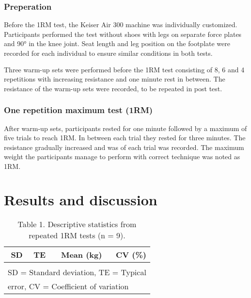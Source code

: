 \documentclass[
]{book}
\begin{document}
\hypertarget{preperation}{%
\subsubsection{Preperation}\label{preperation}}

Before the 1RM test, the Keiser Air 300 machine was individually customized. Participants performed the test without shoes with legs on separate force plates and 90° in the knee joint. Seat length and leg position on the footplate were recorded for each individual to ensure similar conditions in both tests.

Three warm-up sets were performed before the 1RM test consisting of 8, 6 and 4 repetitions with increasing resistance and one minute rest in between. The resistance of the warm-up sets were recorded, to be repeated in post test.

\hypertarget{one-repetition-maximum-test-1rm}{%
\subsubsection{One repetition maximum test (1RM)}\label{one-repetition-maximum-test-1rm}}

After warm-up sets, participants rested for one minute followed by a maximum of five trials to reach 1RM. In between each trial they rested for three minutes. The resistance gradually increased and was of each trial was recorded. The maximum weight the participants manage to perform with correct technique was noted as 1RM.

\hypertarget{results-and-discussion}{%
\section{Results and discussion}\label{results-and-discussion}}

\begin{table}

\caption{\label{tab:unnamed-chunk-2}Table 1. Descriptive statistics from repeated 1RM tests (n = 9).}
\centering
\begin{tabular}[t]{r|r|r|r}
\hline
SD & TE & Mean (kg) & CV (\%)\\
\hline
\cellcolor{gray!6}{8.7} & \cellcolor{gray!6}{6.15} & \cellcolor{gray!6}{286.94} & \cellcolor{gray!6}{2.14}\\
\hline
\multicolumn{4}{l}{\textsuperscript{} SD = Standard deviation, TE = Typical}\\
\multicolumn{4}{l}{error, CV = Coefficient of variation}\\
\end{tabular}
\end{table}
\end{document}

